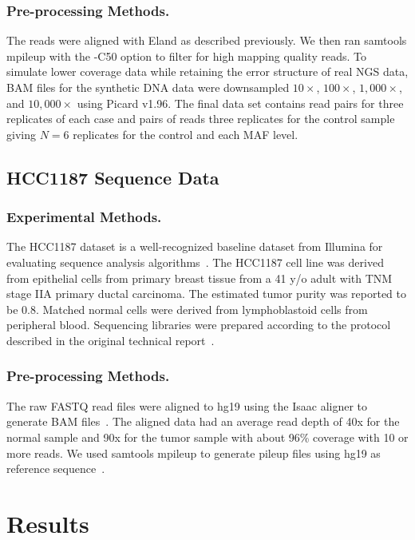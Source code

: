\documentclass{bioinfo}
\begin{document}
\subsubsection*{Pre-processing Methods.}
The reads were aligned with Eland as described previously. We then ran samtools mpileup with the -C50 option to filter for high mapping quality reads. To simulate lower coverage data while retaining the error structure of real NGS data, BAM files for the synthetic DNA data were downsampled $10\times$, $100\times$, $1,000\times$, and $10,000\times$ using Picard v1.96. The final data set contains read pairs for three replicates of each case and pairs of reads three replicates for the control sample giving $N=6$ replicates for the control and each MAF level.

\subsection{HCC1187 Sequence Data}
\subsubsection*{Experimental Methods.}
The HCC1187 dataset is a well-recognized baseline dataset from Illumina for evaluating sequence analysis algorithms~\citep{newman2013relative,howarth2011large,howarth2007array}. The HCC1187 cell line was derived from  epithelial cells from primary breast tissue from a 41 y/o adult with TNM stage IIA primary ductal carcinoma. The estimated tumor purity was reported to be 0.8. Matched normal cells were derived from lymphoblastoid cells from peripheral blood. Sequencing libraries were prepared according to the protocol described in the original technical report~\citep{hcc1187techreport}.
\subsubsection*{Pre-processing Methods.}
 The raw FASTQ read files were aligned to hg19 using the Isaac aligner to generate BAM files~\citep{raczy2013isaac}. The aligned data had an average read depth of 40x for the normal sample and 90x for the tumor sample with about 96\% coverage with 10 or more reads. We used samtools mpileup to generate pileup files using hg19 as reference sequence~\citep{Navin:2010gu}.


\section{Results}
\end{document}
